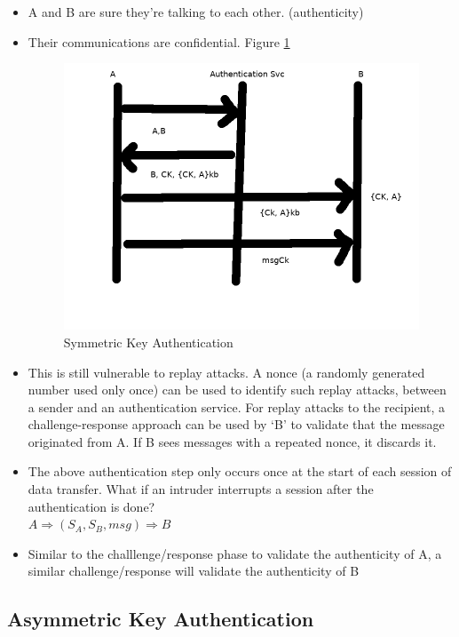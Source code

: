 \documentclass[parskip=half]{scrartcl}
\begin{document}
        \begin{itemize}
            \item 
            A and B are sure they're talking to each other. (authenticity)
            \item 
            Their communications are confidential. Figure \ref{fig:symmetric-key-auth}
            \begin{figure}[ht]
                \centering
                \includegraphics[width=.4\textwidth]{symmetric-key-auth}
                \caption{Symmetric Key Authentication}
                \label{fig:symmetric-key-auth}
            \end{figure}
            \item 
            This is still vulnerable to replay attacks. A nonce (a randomly generated number used only once) can be used to identify such replay attacks, between a sender and an authentication service. For replay attacks to the recipient, a challenge-response approach can be used by `B' to validate that the message originated from A. If B sees messages with a repeated nonce, it discards it.
            \item 
            The above authentication step only occurs once at the start of each session of data transfer. What if an intruder interrupts a session after the authentication is done?\\
            $A \Rightarrow (S_A, S_B, msg) \Rightarrow B$ 
            \item 
            Similar to the challlenge/response phase to validate the authenticity of A, a similar challenge/response will validate the authenticity of B
        \end{itemize}


    \subsection{Asymmetric Key Authentication} %
    \label{sub:asymmetric_key_authentication}
\end{document}
